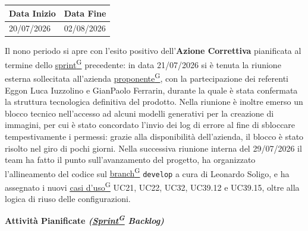 \documentclass[a4paper,12pt]{article}
\newcounter{subsubsubsection}[subsubsection]
\providecommand{\glslink}[2]{\href{https://alittlebyte-19.github.io/Documentazione/glossario.html\#gls-#1}{\underline{#2}\textsuperscript{\scriptsize G}}}
\begin{document}

\label{sec:pb_nonoperiodo}
\begin{table}[H]
    \centering
    \renewcommand{\arraystretch}{1.5}
    \begin{tabularx}{\textwidth}{|X|X|}
    \hline \rowcolor{Dandelion!50}
    \textbf{Data Inizio} & \textbf{Data Fine}\\
    \hline
    20/07/2026 & 02/08/2026\\
    \hline

    \end{tabularx}
\end{table}

Il nono periodo si apre con l'esito positivo dell'\textbf{Azione Correttiva} pianificata al termine dello \glslink{sprint}{sprint} precedente: in data 21/07/2026 si è tenuta la riunione esterna sollecitata all'azienda \glslink{committente-proponente}{proponente}, con la partecipazione dei referenti Eggon Luca Iuzzolino e GianPaolo Ferrarin, durante la quale è stata confermata la struttura tecnologica definitiva del prodotto. Nella riunione è inoltre emerso un blocco tecnico nell'accesso ad alcuni modelli generativi per la creazione di immagini, per cui è stato concordato l'invio dei log di errore al fine di sbloccare tempestivamente i permessi: grazie alla disponibilità dell'azienda, il blocco è stato risolto nel giro di pochi giorni. Nella successiva riunione interna del 29/07/2026 il team ha fatto il punto sull'avanzamento del progetto, ha organizzato l'allineamento del codice sul \glslink{branch}{branch} \texttt{develop} a cura di Leonardo Soligo, e ha assegnato i nuovi \glslink{caso-d-uso-uc}{casi d'uso} UC21, UC22, UC32, UC39.12 e UC39.15, oltre alla logica di riuso delle configurazioni.

\begin{center}
\noindent\textbf{Attività Pianificate \textit{(\glslink{sprint}{Sprint} Backlog)}}\\
\end{center}
\end{document}
